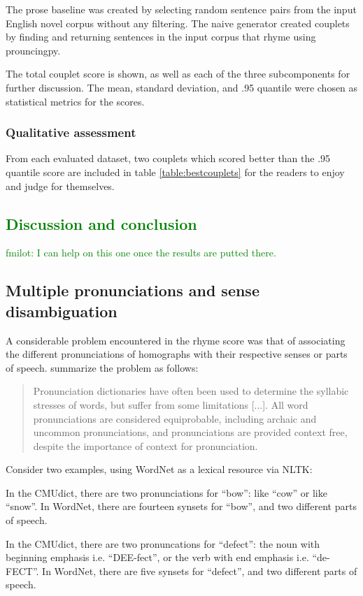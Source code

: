 \documentclass[11pt,a4paper]{article}
\newenvironment{tight_enumerate}{
\begin{enumerate}
\setlength{\itemsep}{0pt}
\setlength{\parskip}{0pt}
}{\end{enumerate}}
\begin{document}
The prose baseline was created by selecting random sentence pairs from the input English novel corpus without any filtering. The naive generator created couplets by finding and returning sentences in the input corpus that rhyme using prouncingpy.

The total couplet score is shown, as well as each of the three subcomponents for further discussion. The mean, standard deviation, and .95 quantile were chosen as statistical metrics for the scores.

\subsubsection{Qualitative assessment}

From each evaluated dataset, two couplets which scored better than the .95 quantile score are included in table \ref{table:bestcouplets} for the readers to enjoy and judge for themselves.

\textcolor{green}{
\section{Discussion and conclusion}
\label{sec:discconc}
fmilot: I can help on this one once the results are putted there.
}

\subsection{Multiple pronunciations and sense disambiguation}
\label{sec:synset}

A considerable problem encountered in the rhyme score was that of associating the different pronunciations of homographs with their respective senses or parts of speech. \citet{hopkins-kiela-2017} summarize the problem as follows:

\begin{quote}
Pronunciation dictionaries have often been used to determine the syllabic stresses of words, but suffer from some limitations [...]. All word pronunciations are considered equiprobable, including archaic and uncommon pronunciations, and pronunciations are provided context free, despite the importance of context for pronunciation.
\end{quote}

Consider two examples, using WordNet \cite{wordnet} as a lexical resource via NLTK:
\begin{tight_enumerate}
	\vspace{-0.5em}
	\item
		In the CMUdict, there are two pronunciations for ``bow'': like ``cow'' or like ``snow''. In WordNet, there are fourteen synsets for ``bow'', and two different parts of speech.
	\item
		In the CMUdict, there are two pronuncations for ``defect'': the noun with beginning emphasis i.e. ``DEE-fect'', or the verb with end emphasis i.e. ``de-FECT''. In WordNet, there are five synsets for ``defect'', and two different parts of speech.
\end{tight_enumerate}
\end{document}
